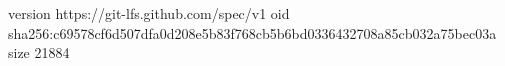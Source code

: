 version https://git-lfs.github.com/spec/v1
oid sha256:c69578cf6d507dfa0d208e5b83f768cb5b6bd0336432708a85cb032a75bec03a
size 21884
